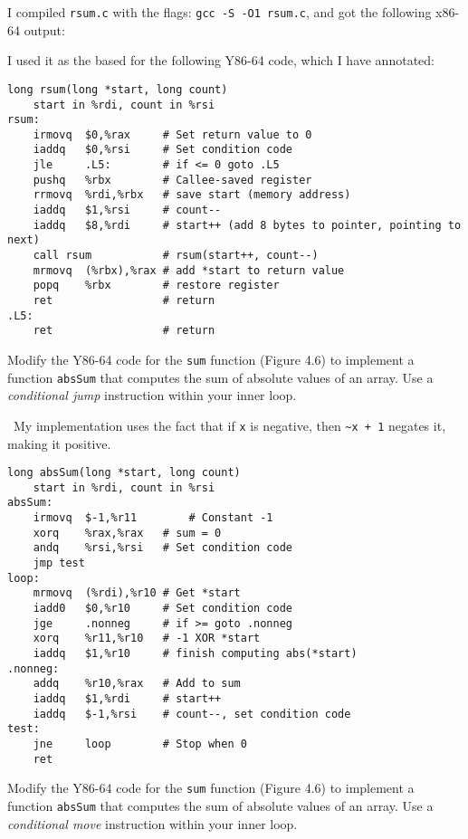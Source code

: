 \documentclass[12pt]{article}
\newenvironment{ex}[2][Exercise]{\begin{trivlist}
		\item[\hskip \labelsep {\bfseries #1}\hskip \labelsep {\bfseries #2.}]}{\end{trivlist}}
\newenvironment{sol}[1][Solution]{\begin{trivlist}
		\item[\hskip \labelsep {\bfseries #1:}]}{\end{trivlist}}
\begin{document}
\begin{sol}
	I compiled \texttt{rsum.c} with the flags: \texttt{gcc -S -O1 rsum.c},
	and got the following x86-64 output:
	
	I used it as the based for the following Y86-64 code, which I have annotated:
	\begin{lstlisting}[language={}]
	long rsum(long *start, long count)
	start in %rdi, count in %rsi
rsum:
	irmovq	$0,%rax		# Set return value to 0
	iaddq	$0,%rsi		# Set condition code
	jle		.L5:		# if <= 0 goto .L5
	pushq	%rbx		# Callee-saved register
	rrmovq	%rdi,%rbx	# save start (memory address)
	iaddq	$1,%rsi		# count--
	iaddq	$8,%rdi		# start++ (add 8 bytes to pointer, pointing to next)
	call rsum			# rsum(start++, count--)
	mrmovq	(%rbx),%rax	# add *start to return value
	popq	%rbx		# restore register
	ret					# return
.L5:					
	ret					# return
	\end{lstlisting}	
\end{sol}

\begin{ex}{4.5}
	Modify the Y86-64 code for the \texttt{sum} function (Figure 4.6) to
	implement a function \texttt{absSum} that computes the sum of absolute
	values of an array. Use a \emph{conditional jump} instruction within your
	inner loop.
\end{ex}

\begin{sol}
	\
	My implementation uses the fact that if \texttt{x} is negative, then
	\texttt{\~{}x + 1} negates it, making it positive.
	\begin{lstlisting}[language={}]
	long absSum(long *start, long count)
	start in %rdi, count in %rsi
absSum:
	irmovq	$-1,%r11		# Constant -1
	xorq	%rax,%rax	# sum = 0
	andq	%rsi,%rsi	# Set condition code
	jmp test
loop:
	mrmovq	(%rdi),%r10	# Get *start
	iadd0	$0,%r10		# Set condition code
	jge		.nonneg		# if >= goto .nonneg
	xorq	%r11,%r10	# -1 XOR *start
	iaddq	$1,%r10		# finish computing abs(*start)
.nonneg:
	addq	%r10,%rax	# Add to sum
	iaddq	$1,%rdi		# start++
	iaddq	$-1,%rsi	# count--, set condition code
test:
	jne		loop		# Stop when 0
	ret
	\end{lstlisting}
\end{sol}

\begin{ex}{4.6}
	Modify the Y86-64 code for the \texttt{sum} function (Figure 4.6) to
	implement a function \texttt{absSum} that computes the sum of absolute
	values of an array. Use a \emph{conditional move} instruction within your
	inner loop.
\end{ex}
\end{document}
